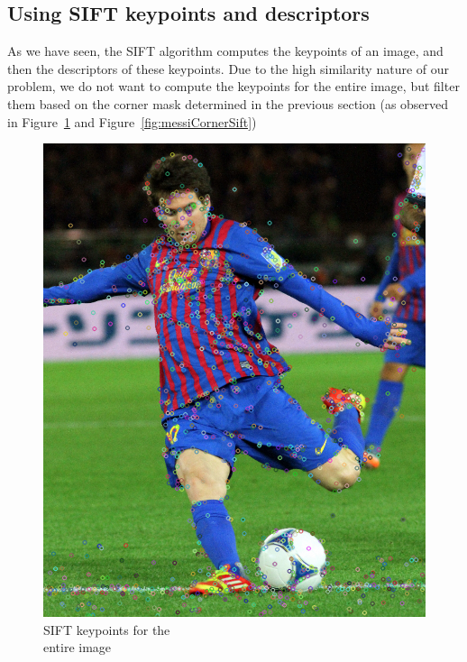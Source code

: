 \subsection{Using SIFT keypoints and descriptors}

As we have seen, the SIFT algorithm computes the keypoints of an image, and then the descriptors of these keypoints. Due to the high similarity nature of our problem, we do not want to compute the keypoints for the entire image, but filter them based on the corner mask determined in the previous section (as observed in Figure~\ref{fig:messiSift} and Figure~\ref{fig:messiCornerSift})

\begin{figure}[ht!]
\centering
\begin{minipage}{.5\textwidth}
	\centering
	\includegraphics[width=.8\linewidth]{images/messiSift.png}
	\caption{SIFT keypoints for the\\ entire image}
	\label{fig:messiSift}
\end{minipage}%
\begin{minipage}{.5\textwidth}
	\centering

\end{minipage}
\end{figure}
